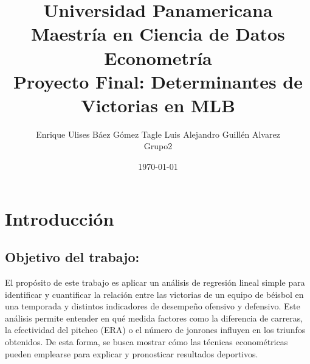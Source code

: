 \documentclass[10pt]{article}
\title{Universidad Panamericana \\ Maestría en Ciencia de Datos 
\\ Econometría \\ \vspace{0.5cm} 
Proyecto Final: Determinantes de Victorias en MLB
}
\author{Enrique Ulises Báez Gómez Tagle
    Luis Alejandro Guillén Alvarez\\
    Grupo2
}
\date{\today}
\begin{document}
\maketitle

\tableofcontents

\newpage
\section{Introducción}
\subsection{Objetivo del trabajo:}
El propósito de este trabajo es aplicar un análisis de regresión lineal simple para identificar y cuantificar la relación entre las victorias de un equipo de béisbol en una temporada y distintos indicadores de desempeño ofensivo y defensivo. Este análisis permite entender en qué medida factores como la diferencia de carreras, la efectividad del pitcheo (ERA) o el número de jonrones influyen en los triunfos obtenidos. De esta forma, se busca mostrar cómo las técnicas econométricas pueden emplearse para explicar y pronosticar resultados deportivos.
\end{document}
